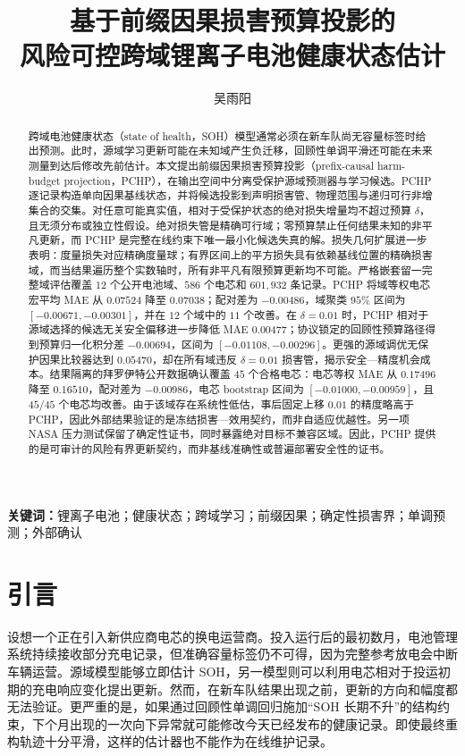 \documentclass[UTF8,11pt]{ctexart}
\title{\textbf{基于前缀因果损害预算投影的\\风险可控跨域锂离子电池健康状态估计}}
\author{吴雨阳}
\date{}
\begin{document}
\maketitle

\begin{abstract}
跨域电池健康状态（state of health，SOH）模型通常必须在新车队尚无容量标签时给出预测。此时，源域学习更新可能在未知域产生负迁移，回顾性单调平滑还可能在未来测量到达后修改先前估计。本文提出前缀因果损害预算投影（prefix-causal harm-budget projection，PCHP），在输出空间中分离受保护源域预测器与学习候选。PCHP 逐记录构造单向因果基线状态，并将候选投影到声明损害管、物理范围与递归可行非增集合的交集。对任意可能真实值，相对于受保护状态的绝对损失增量均不超过预算 $\delta$，且无须分布或独立性假设。绝对损失管是精确可行域；零预算禁止任何结果未知的非平凡更新，而 PCHP 是完整在线约束下唯一最小化候选失真的解。损失几何扩展进一步表明：度量损失对应精确度量球；有界区间上的平方损失具有依赖基线位置的精确损害域，而当结果遍历整个实数轴时，所有非平凡有限预算更新均不可能。严格嵌套留一完整域评估覆盖 $12$ 个公开电池域、$586$ 个电芯和 $601{,}932$ 条记录。PCHP 将域等权电芯宏平均 MAE 从 $0.07524$ 降至 $0.07038$；配对差为 $-0.00486$，域聚类 $95\%$ 区间为 $[-0.00671,-0.00301]$，并在 $12$ 个域中的 $11$ 个改善。在 $\delta=0.01$ 时，PCHP 相对于源域选择的候选无关安全偏移进一步降低 MAE $0.00477$；协议锁定的回顾性预算路径得到预算归一化积分差 $-0.00694$，区间为 $[-0.01108,-0.00296]$。更强的源域调优无保护因果比较器达到 $0.05470$，却在所有域违反 $\delta=0.01$ 损害管，揭示安全—精度机会成本。结果隔离的拜罗伊特公开数据确认覆盖 $45$ 个合格电芯：电芯等权 MAE 从 $0.17496$ 降至 $0.16510$，配对差为 $-0.00986$，电芯 bootstrap 区间为 $[-0.01000,-0.00959]$，且 $45/45$ 个电芯均改善。由于该域存在系统性低估，事后固定上移 $0.01$ 的精度略高于 PCHP，因此外部结果验证的是冻结损害—效用契约，而非自适应优越性。另一项 NASA 压力测试保留了确定性证书，同时暴露绝对目标不兼容区域。因此，PCHP 提供的是可审计的风险有界更新契约，而非基线准确性或普遍部署安全性的证书。
\end{abstract}

\noindent\textbf{关键词：}锂离子电池；健康状态；跨域学习；前缀因果；确定性损害界；单调预测；外部确认

\section{引言}

设想一个正在引入新供应商电芯的换电运营商。投入运行后的最初数月，电池管理系统持续接收部分充电记录，但准确容量标签仍不可得，因为完整参考放电会中断车辆运营。源域模型能够立即估计 SOH，另一模型则可以利用电芯相对于投运初期的充电响应变化提出更新。然而，在新车队结果出现之前，更新的方向和幅度都无法验证。更严重的是，如果通过回顾性单调回归施加“SOH 长期不升”的结构约束，下个月出现的一次向下异常就可能修改今天已经发布的健康记录。即使最终重构轨迹十分平滑，这样的估计器也不能作为在线维护记录。
\end{document}
